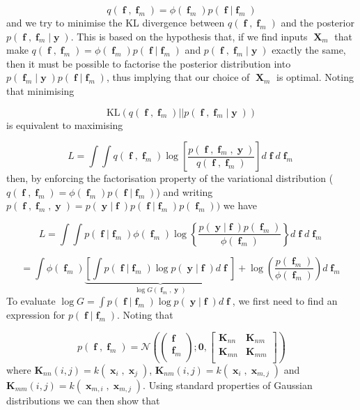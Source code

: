 \documentclass[a4paper, 11pt]{article}
\DeclareMathOperator{\x}{\boldsymbol{x}}
\DeclareMathOperator{\X}{\boldsymbol{X}}
\DeclareMathOperator{\y}{\boldsymbol{y}}
\DeclareMathOperator{\f}{\boldsymbol{f}}
\begin{document}
\begin{equation}
	q(\f,\f_m) = \phi(\f_m) p(\f|\f_m)
\end{equation}
and we try to minimise the KL divergence between $q(\f,\f_m)$ and the posterior $p(\f,\f_m|\y)$. This is based on the hypothesis that, if we find inputs $\X_m$ that make $q(\f,\f_m) = \phi(\f_m) p(\f|\f_m)$ and $p(\f,\f_m|\y)$ exactly the same, then it must be possible to factorise the posterior distribution into $p(\f_m|\y)p(\f|\f_m)$, thus implying that our choice of $\X_m$ is optimal. Noting that minimising

\begin{equation}
	\text{KL}(q(\f,\f_m) || p(\f,\f_m|\y))
\end{equation}
is equivalent to maximising

\begin{equation}
	L = \int \int q(\f,\f_m) \log \left[ \frac{p(\f,\f_m,\y)}{q(\f,\f_m)} \right] d\f d\f_m
\end{equation}
then, by enforcing the factorisation property of the variational distribution ($q(\f,\f_m) = \phi(\f_m) p(\f|\f_m)$) and writing $p(\f,\f_m,\y) = p(\y|\f)p(\f|\f_m)p(\f_m))$ we have

\begin{equation}
	L = \int \int p(\f|\f_m) \phi(\f_m) \log \left\{ \frac{p(\y|\f)p(\f_m)}{\phi(\f_m)} \right\} d\f d\f_m
\end{equation}

\begin{equation}
	= \int \phi(\f_m) \underbrace{\left[  \int p(\f|\f_m)\log p(\y|\f) d\f \right]}_{\log G(\f_m,\y)}  + \log \left( \frac{p(\f_m)}{\phi(\f_m)} \right) d\f_m
\end{equation}
To evaluate $\log G = \int p(\f|\f_m)\log p(\y|\f) d\f $, we first need to find an expression for $p(\f|\f_m)$. Noting that

\begin{equation}
	p(\f,\f_m) = \mathcal{N}\left(
	\left(
	\begin{array}{c}
		\f \\
		\f_m \\
	\end{array}
	\right);
	\boldsymbol{0}, \left[
	\begin{array}{cc}
		\boldsymbol{K}_{nn} & \boldsymbol{K}_{nm}\\
		\boldsymbol{K}_{mn} & \boldsymbol{K}_{mm} \\
	\end{array}
	\right]
	\right)
\end{equation}
where $\boldsymbol{K}_{nn}(i,j) = k(\x_i,\x_j)$, $\boldsymbol{K}_{nm}(i,j) = k(\x_i,\x_{m,j})$ and $\boldsymbol{K}_{mm}(i,j) = k(\x_{m,i},\x_{m,j})$. Using standard properties of Gaussian distributions we can then show that
\end{document}
